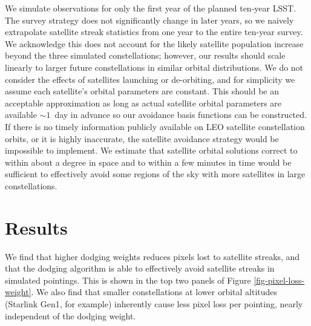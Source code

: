 \documentclass[twocolumn]{aastex631}
\begin{document}
We simulate observations for only the first year of the planned ten-year LSST. The survey strategy does not significantly change in later years, so we naively extrapolate satellite streak statistics from one year to the entire ten-year survey. We acknowledge this does not account for the likely satellite population increase beyond the three simulated constellations; however, our results should scale linearly to larger future constellations in similar orbital distributions. We do not consider the effects of satellites launching or de-orbiting, and for simplicity we assume each satellite's orbital parameters are constant. This should be an acceptable approximation as long as actual satellite orbital parameters are available $\sim1$\ day in advance so our avoidance basis functions can be constructed. If there is no timely information publicly available on LEO satellite constellation orbits, or it is highly inaccurate, the satellite avoidance strategy would be impossible to implement. We estimate that satellite orbital solutions correct to within about a degree in space and to within a few minutes in time would be sufficient to effectively avoid some regions of the sky with more satellites in large constellations.


\section{Results}\label{results}

We find that higher dodging weights reduces pixels lost to satellite streaks, and that the dodging algorithm is able to effectively avoid satellite streaks in simulated pointings. This is shown in the top two panels of Figure \ref{fig-pixel-loss-weight}. We also find that smaller constellations at lower orbital altitudes (Starlink Gen1, for example) inherently cause less pixel loss per pointing, nearly independent of the dodging weight.

\begin{figure*}[ht!]
\caption{To reduce the fraction of visits with streaks by a factor of two, satellite avoidance will require 10\% of total observing time.
The top panels show that, as expected, the mean streak length per visit (upper left) and fraction of streaked visits (upper right) decrease as more emphasis is put on avoiding satellites. The bottom panels show the resulting trade off, as avoiding satellites forces the scheduler to spend more time slewing and observe less desirable parts of the sky. This result in fewer total exposures in the first year (lower left) and a shallower median co-added survey depth, shown here in $g$-band (lower right).
\label{fig-pixel-loss-weight}}
\end{figure*}
\end{document}
